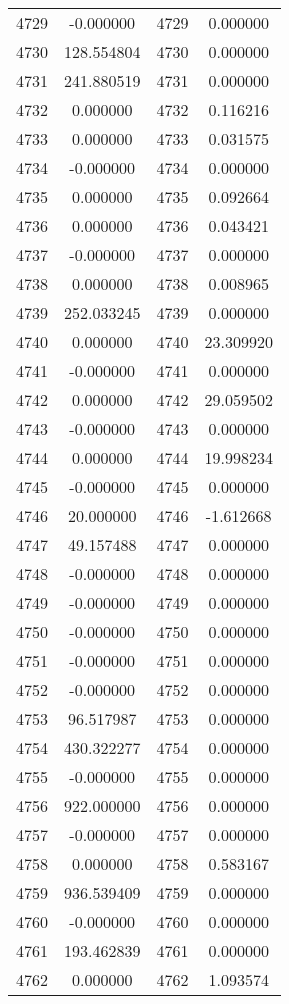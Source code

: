 \documentclass[12pt]{article}
\begin{document}
\begin{longtable}{@{}cccc@{}}
4729 & -0.000000 & 4729 & 0.000000 \\
4730 & 128.554804 & 4730 & 0.000000 \\
4731 & 241.880519 & 4731 & 0.000000 \\
4732 & 0.000000 & 4732 & 0.116216 \\
4733 & 0.000000 & 4733 & 0.031575 \\
4734 & -0.000000 & 4734 & 0.000000 \\
4735 & 0.000000 & 4735 & 0.092664 \\
4736 & 0.000000 & 4736 & 0.043421 \\
4737 & -0.000000 & 4737 & 0.000000 \\
4738 & 0.000000 & 4738 & 0.008965 \\
4739 & 252.033245 & 4739 & 0.000000 \\
4740 & 0.000000 & 4740 & 23.309920 \\
4741 & -0.000000 & 4741 & 0.000000 \\
4742 & 0.000000 & 4742 & 29.059502 \\
4743 & -0.000000 & 4743 & 0.000000 \\
4744 & 0.000000 & 4744 & 19.998234 \\
4745 & -0.000000 & 4745 & 0.000000 \\
4746 & 20.000000 & 4746 & -1.612668 \\
4747 & 49.157488 & 4747 & 0.000000 \\
4748 & -0.000000 & 4748 & 0.000000 \\
4749 & -0.000000 & 4749 & 0.000000 \\
4750 & -0.000000 & 4750 & 0.000000 \\
4751 & -0.000000 & 4751 & 0.000000 \\
4752 & -0.000000 & 4752 & 0.000000 \\
4753 & 96.517987 & 4753 & 0.000000 \\
4754 & 430.322277 & 4754 & 0.000000 \\
4755 & -0.000000 & 4755 & 0.000000 \\
4756 & 922.000000 & 4756 & 0.000000 \\
4757 & -0.000000 & 4757 & 0.000000 \\
4758 & 0.000000 & 4758 & 0.583167 \\
4759 & 936.539409 & 4759 & 0.000000 \\
4760 & -0.000000 & 4760 & 0.000000 \\
4761 & 193.462839 & 4761 & 0.000000 \\
4762 & 0.000000 & 4762 & 1.093574 \\

\end{longtable}
\end{document}
